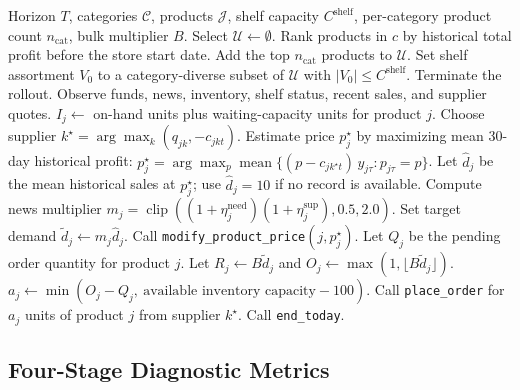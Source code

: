 \begin{algorithm}[t]
\small
\caption{Hand-crafted quality-based policy}
\label{alg:handcrafted_policy}
\begin{algorithmic}[1]
\Require Horizon $T$, categories $\mathcal{C}$, products $\mathcal{J}$, shelf capacity $C^{\mathrm{shelf}}$, per-category product count $n_{\mathrm{cat}}$, bulk multiplier $B$.
\State Select $\mathcal{U}\leftarrow\emptyset$.
    \State Rank products in $c$ by historical total profit before the store start date.
    \State Add the top $n_{\mathrm{cat}}$ products to $\mathcal{U}$.
\EndFor
\State Set shelf assortment $V_0$ to a category-diverse subset of $\mathcal{U}$ with $|V_0|\le C^{\mathrm{shelf}}$.
        \State Terminate the rollout.
    \EndIf
    \State Observe funds, news, inventory, shelf status, recent sales, and supplier quotes.
        \State $I_j \leftarrow$ on-hand units plus waiting-capacity units for product $j$.
        \State Choose supplier $k^\star=\arg\max_k(q_{jk},-c_{jkt})$.
        \State Estimate price $p^\star_j$ by maximizing mean 30-day historical profit:
        \Statex \hspace{\algorithmicindent} $p^\star_j=\arg\max_p \operatorname{mean}\{(p-c_{jk^\star t})\,y_{j\tau}:p_{j\tau}=p\}$.
        \State Let $\hat d_j$ be the mean historical sales at $p^\star_j$; use $\hat d_j=10$ if no record is available.
        \State Compute news multiplier $m_j=\operatorname{clip}((1+\eta^{\mathrm{need}}_j)(1+\eta^{\mathrm{sup}}_j),0.5,2.0)$.
        \State Set target demand $\tilde d_j \leftarrow m_j\hat d_j$.
            \State Call \texttt{modify\_product\_price}$(j,p^\star_j)$.
        \EndIf
        \State Let $Q_j$ be the pending order quantity for product $j$.
        \State Let $R_j\leftarrow B\tilde d_j$ and $O_j\leftarrow \max(1,\lfloor B\tilde d_j\rfloor)$.
            \State $a_j\leftarrow \min(O_j-Q_j,\ \text{available inventory capacity}-100)$.
                \State Call \texttt{place\_order} for $a_j$ units of product $j$ from supplier $k^\star$.
            \EndIf
        \EndIf
    \EndFor
    \State Call \texttt{end\_today}.
\EndFor
\end{algorithmic}
\end{algorithm}

\subsection{Four-Stage Diagnostic Metrics}
\label{appendix:stage_metrics}

